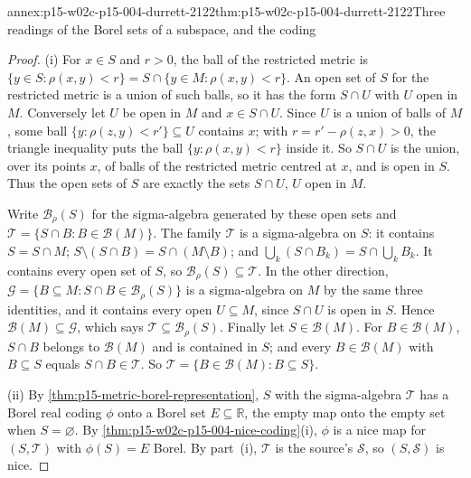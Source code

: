 \begin{annexitem}{annex:p15-w02c-p15-004-durrett-2122}{thm:p15-w02c-p15-004-durrett-2122}{Three readings of the Borel sets of a subspace, and the coding}
\begin{proof}
(i) For \(x\in S\) and \(r>0\), the ball of the restricted metric is
\(\{y\in S:\rho(x,y)<r\}=S\cap\{y\in M:\rho(x,y)<r\}\). An open set of
\(S\) for the restricted metric is a union of such balls, so it has the
form \(S\cap U\) with \(U\) open in \(M\). Conversely let \(U\) be open in
\(M\) and \(x\in S\cap U\). Since \(U\) is a union of balls of \(M\), some
ball \(\{y:\rho(z,y)<r'\}\subseteq U\) contains \(x\); with
\(r=r'-\rho(z,x)>0\), the triangle inequality puts the ball
\(\{y:\rho(x,y)<r\}\) inside it. So \(S\cap U\) is the union, over its
points \(x\), of balls of the restricted metric centred at \(x\), and is
open in \(S\). Thus the open sets of \(S\) are exactly the sets
\(S\cap U\), \(U\) open in \(M\).

Write \(\mathcal B_\rho(S)\) for the sigma-algebra generated by these open
sets and \(\mathcal T=\{S\cap B:B\in\mathcal B(M)\}\). The family
\(\mathcal T\) is a sigma-algebra on \(S\): it contains \(S=S\cap M\);
\(S\setminus(S\cap B)=S\cap(M\setminus B)\); and
\(\bigcup_k(S\cap B_k)=S\cap\bigcup_kB_k\). It contains every open set of
\(S\), so \(\mathcal B_\rho(S)\subseteq\mathcal T\). In the other
direction, \(\mathcal G=\{B\subseteq M:S\cap B\in\mathcal B_\rho(S)\}\) is
a sigma-algebra on \(M\) by the same three identities, and it contains
every open \(U\subseteq M\), since \(S\cap U\) is open in \(S\). Hence
\(\mathcal B(M)\subseteq\mathcal G\), which says
\(\mathcal T\subseteq\mathcal B_\rho(S)\). Finally let
\(S\in\mathcal B(M)\). For \(B\in\mathcal B(M)\), \(S\cap B\) belongs to
\(\mathcal B(M)\) and is contained in \(S\); and every \(B\in\mathcal B(M)\)
with \(B\subseteq S\) equals \(S\cap B\in\mathcal T\). So
\(\mathcal T=\{B\in\mathcal B(M):B\subseteq S\}\).

(ii) By \cref{thm:p15-metric-borel-representation}, \(S\) with the
sigma-algebra \(\mathcal T\) has a Borel real coding \(\phi\) onto a
Borel set \(E\subseteq\mathbb R\), the empty map onto the empty set when
\(S=\varnothing\). By \cref{thm:p15-w02c-p15-004-nice-coding}(i),
\(\phi\) is a nice map for \((S,\mathcal T)\) with \(\phi(S)=E\) Borel. By
part~(i), \(\mathcal T\) is the source's \(\mathcal S\), so
\((S,\mathcal S)\) is nice.
\end{proof}
\end{annexitem}

